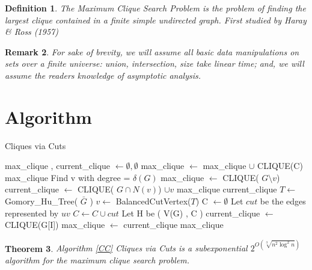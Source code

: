 \documentclass[12pt]{article}
\newtheorem{thm}{Theorem}[section]
\newtheorem{mydef}[thm]{Definition}
\newtheorem{rem}[thm]{Remark}
\begin{document}
\begin{mydef} The Maximum Clique Search Problem is the problem of finding the largest clique contained in a finite simple undirected graph. First studied by Haray \& Ross (1957)\cite{HarayANDRoss1957} \end{mydef}

\begin{rem}\label{brevity} For sake of brevity, we will assume all basic data manipulations on sets over a finite universe: union, intersection, size take linear time; and, we will assume the readers knowledge of asymptotic analysis.
\end{rem}

\section{Algorithm}

\begin{algorithm}
\caption{Cliques via Cuts\label{CC} } 
\begin{algorithmic}[1]
\State max\_clique , current\_clique $\gets \emptyset, \emptyset$
\State max\_clique $\gets$ max\_clique $\cup$ CLIQUE(C)
\EndFor
\State \Return max\_clique
\EndIf
{}
\State Find v with degree = $\delta(G)$
\State max\_clique $\gets$ CLIQUE( $G \setminus v$)
\State current\_clique $\gets$ CLIQUE( $G \cap N(v) $) $\cup v$
 {\Return max\_clique} \EndIf \Return current\_clique
\EndIf
\State $ T \gets$ Gomory\_Hu\_Tree( $\bar{G}$ )
\State $ v \gets$ BalancedCutVertex($T$)
\State C $\gets \emptyset $
\State Let $cut$ be the edges represented by $uv$
\State $C \gets C \cup cut $
\EndFor
\State Let H be ( V(G) , C )
\State current\_clique $\gets$ CLIQUE(G[I])
max\_clique $\gets$ current\_clique \EndIf
\EndFor
\State \Return max\_clique
\EndProcedure
\end{algorithmic}
\end{algorithm}

\begin{thm} \label{main} Algorithm \ref{CC} Cliques via Cuts  is a subexponential $2^{O(\sqrt[3]{n^2\log^2n})}$ algorithm for the maximum clique search problem. \end{thm}
\end{document}
